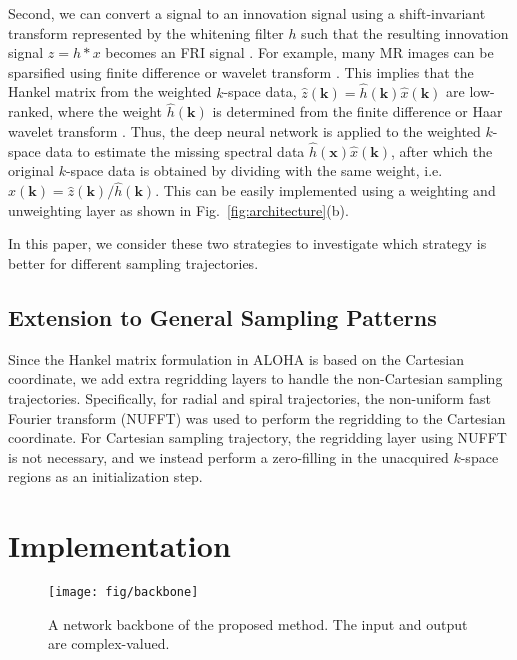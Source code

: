 \documentclass[10pt,journal]{IEEEtran}
\newcommand{\kb}{{\mathbf k}}
\newcommand{\xb}{{\mathbf x}}
\newcommand{\0}{{\boldsymbol{0}}}
\begin{document}
Second, we can  convert a signal to an innovation signal  using a 
 shift-invariant transform represented by the whitening filter $h$ such that
 the resulting innovation signal
  $z = h \ast x$
 becomes an FRI signal \cite{vetterli2002sampling}.  
  For example,  many MR images can be sparsified using finite difference or wavelet transform
 \cite{jin2016general}.  
 This implies that the Hankel matrix from the weighted $k$-space data,
 $\hat z (\kb) = \hat h(\kb)\hat x (\kb)$ are low-ranked, 
where the weight $\hat h(\kb)$ is determined
  from the finite difference or Haar wavelet transform \cite{jin2016general,ye2016compressive}.
  Thus, the deep neural network is applied to the weighted $k$-space data to estimate
  the missing  spectral data $\hat  h(\xb)\hat x(\kb)$, after which the original $k$-space data is obtained
  by dividing with the same weight, i.e. $\hat x (\kb) =  \hat z(\kb)/\hat h(\kb)$.
 This can be easily implemented using a weighting and unweighting layer as shown in Fig.~\ref{fig:architecture}(b).


In this paper, we consider these
two strategies to investigate which strategy is better for different sampling trajectories.

\subsection{Extension to General Sampling Patterns}

Since the Hankel matrix formulation in ALOHA  is based on the Cartesian coordinate, we add extra regridding layers to handle the non-Cartesian sampling trajectories. 
Specifically, for radial and spiral trajectories, the non-uniform fast Fourier transform (NUFFT) was used to perform the regridding to the Cartesian coordinate. 
For Cartesian sampling trajectory, the regridding layer using NUFFT is  not necessary, and
we instead perform a zero-filling in the unacquired $k$-space regions as an initialization step.



\section{Implementation}





\begin{figure}[!t] 	
\centering
{\texttt{[image: fig/backbone]}}
\caption{A network backbone of the proposed method. The input and output are complex-valued.}
\label{fig:backbone}
\end{figure}
\end{document}
